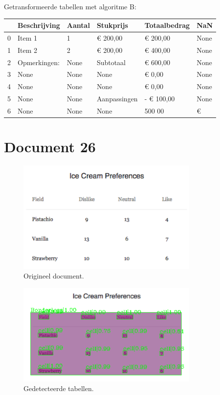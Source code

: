 Getransformeerde tabellen met algoritme B:

\begin{tabular}{llllll}
\toprule
{} &  Beschrijving & Aantal &     Stukprijs & Totaalbedrag &   NaN \\
\midrule
0 &        Item 1 &      1 &      € 200,00 &     € 200,00 &  None \\
1 &        Item 2 &      2 &      € 200,00 &     € 400,00 &  None \\
2 &  Opmerkingen: &   None &     Subtotaal &     € 600,00 &  None \\
3 &          None &   None &          None &       € 0,00 &  None \\
4 &          None &   None &          None &       € 0,00 &  None \\
5 &          None &   None &  Aanpassingen &   - € 100,00 &  None \\
6 &          None &   None &          None &       500 00 &     € \\
\bottomrule
\end{tabular}
\section{Document 26}

\begin{figure}[H]
    \centering
    \includegraphics[width=0.8\textwidth]{test-resultaten/26/original.jpg}
    \caption{Origineel document.}
\end{figure}

\begin{figure}[H]
    \centering
    \includegraphics[width=0.8\textwidth]{test-resultaten/26/detected_tables.png}
    \caption{Gedetecteerde tabellen.}
\end{figure}

